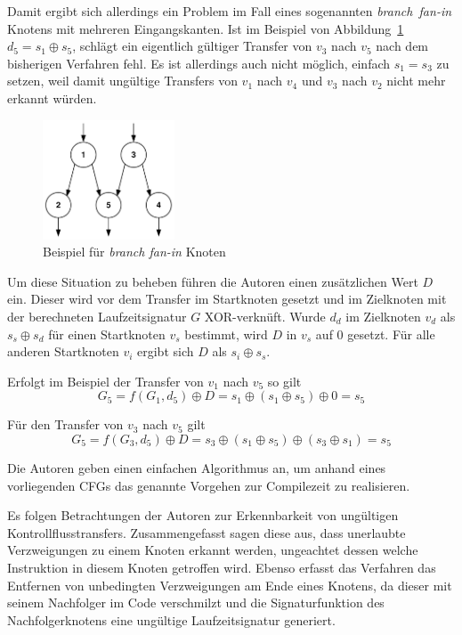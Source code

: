 \documentclass[11pt]{article}
\begin{document}
Damit ergibt sich allerdings ein Problem im Fall eines sogenannten
\mbox{\emph{branch fan-in}} Knotens mit mehreren Eingangskanten. Ist im
Beispiel von Abbildung~\ref{fig:fanin-node} $ d_5 = s_1 \oplus s_5 $, schlägt
ein eigentlich gültiger Transfer von $ v_3 $ nach $ v_5 $ nach dem bisherigen
Verfahren fehl. Es ist allerdings auch nicht möglich, einfach $ s_1 = s_3 $ zu
setzen, weil damit ungültige Transfers von $ v_1 $ nach $ v_4 $ und $ v_3
$ nach $ v_2 $ nicht mehr erkannt würden.

\begin{figure}
  \centering
  \includegraphics[width=0.35\textwidth]{fanin-node}
  \caption{Beispiel für \emph{branch fan-in} Knoten}
  \label{fig:fanin-node}
\end{figure}

Um diese Situation zu beheben führen die Autoren einen zusätzlichen Wert
$ D $ ein. Dieser wird vor dem Transfer im Startknoten gesetzt und im
Zielknoten mit der berechneten Laufzeitsignatur $ G $ XOR-verknüft.  Wurde
$ d_d $ im Zielknoten $ v_d $ als $ s_s \oplus s_d $ für einen Startknoten
$ v_s $ bestimmt, wird $ D $ in $ v_s $ auf $ 0 $ gesetzt. Für alle anderen
Startknoten $ v_i $ ergibt sich $ D $ als $ s_i \oplus s_s $.

Erfolgt im Beispiel der Transfer von $ v_1 $ nach $ v_5 $ so gilt $$ G_5
= f(G_1, d_5) \oplus D = s_1 \oplus (s_1 \oplus s_5) \oplus 0 = s_5 $$

Für den Transfer von $ v_3 $ nach $ v_5 $ gilt $$ G_5 = f(G_3, d_5) \oplus
D = s_3 \oplus (s_1 \oplus s_5) \oplus (s_3 \oplus s_1) = s_5 $$

Die Autoren geben einen einfachen Algorithmus an, um anhand eines vorliegenden
CFGs das genannte Vorgehen zur Compilezeit zu realisieren.

Es folgen Betrachtungen der Autoren zur Erkennbarkeit von ungültigen
Kontrollflusstransfers. Zusammengefasst sagen diese aus, dass unerlaubte
Verzweigungen zu einem Knoten erkannt werden, ungeachtet dessen welche
Instruktion in diesem Knoten getroffen wird. Ebenso erfasst das Verfahren das
Entfernen von unbedingten Verzweigungen am Ende eines Knotens, da dieser mit
seinem Nachfolger im Code verschmilzt und die Signaturfunktion des
Nachfolgerknotens eine ungültige Laufzeitsignatur generiert.
\end{document}
